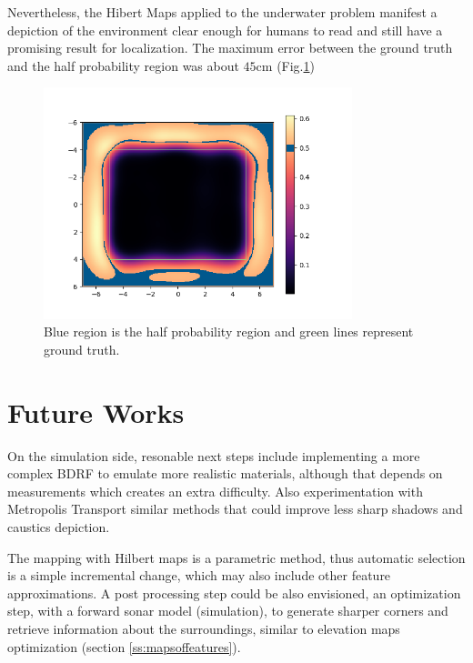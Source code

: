 Nevertheless, the Hibert Maps applied to the underwater problem manifest a
depiction of the environment clear enough for humans to read and still have a
promising result for localization. The maximum error between the ground truth
and the half probability region was about $45$cm (Fig.\ref{fig:halfprob})


\begin{figure}[h]
	\centering
	\includegraphics[width=0.8\textwidth]{Chap5/fig/wall_one_full_z_-1_change}
	\caption{Blue region is the half probability region and green lines represent
	ground truth.}
	\label{fig:halfprob}
\end{figure}

\section{Future Works}

On the simulation side, resonable next steps include implementing a more complex
BDRF to emulate more realistic materials, although that depends on measurements
which creates an extra difficulty. Also experimentation with Metropolis
Transport similar methods that could improve less sharp shadows and caustics
depiction.

The mapping with Hilbert maps is a parametric method, thus automatic selection
is a simple incremental change, which may also include other feature
approximations. A post processing step could be also envisioned, an optimization
step, with a forward sonar model (simulation), to generate sharper corners and
retrieve information about the surroundings, similar to elevation maps optimization (section
\ref{ss:mapsoffeatures}).
